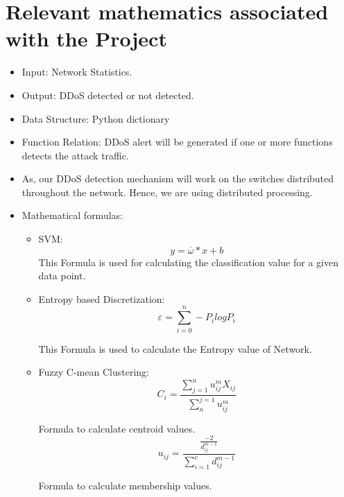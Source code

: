 \documentclass[12pt,a4paper,final]{report}
\begin{document}
\section{Relevant mathematics associated with the Project}
\begin{itemize}
\item Input: Network Statistics.
\item Output: DDoS detected or not detected.
\item Data Structure: Python dictionary
\item Function Relation: DDoS alert will be generated if one or more functions detects the attack traffic.
\item As, our DDoS detection mechanism will work on the switches distributed throughout the network. Hence, we are using distributed processing.
\item Mathematical formulas: 
\begin{flushleft}
\begin{itemize}
\item SVM:
\linebreak
\begin{equation}
y = \overline{\omega} * x + b
\end{equation}
\linebreak
This Formula is used for calculating the classification value for a given data point.
		 
\item Entropy based Discretization:
\linebreak
\begin{equation}
\varepsilon = \sum_{i=0}^{n} - P_{i} log P_{i}
\end{equation}

This Formula is used to calculate the Entropy value of Network.
		
\item Fuzzy C-mean Clustering:
\linebreak
\begin{equation}
C_{i} = \frac{\sum_{j=1}^{n}u_{ij}^{m}X_{ij}}{\sum_{n}^{j=1}u_{ij}^{m}}
\end{equation}

Formula to calculate centroid values. \\
\begin{equation}
u_{ij} = \frac{\frac{-2}{d_{ij}^{m-1}}}{\sum_{i=1}^{c}{{d_{ij}^{m-1}}}}
\end{equation}

Formula to calculate membership values.
\end{itemize}
\end{flushleft}	
	

\end{itemize}
\end{document}
